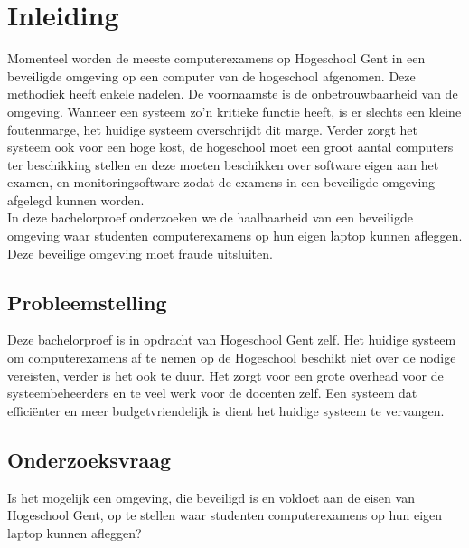 
\chapter{Inleiding}
\label{ch:inleiding}



 Momenteel worden de meeste computerexamens op Hogeschool Gent in een beveiligde omgeving op een computer van de hogeschool afgenomen. Deze methodiek heeft enkele nadelen. De voornaamste is de onbetrouwbaarheid van de omgeving. Wanneer een systeem zo'n kritieke functie heeft, is er slechts een kleine foutenmarge, het huidige systeem overschrijdt dit marge.  Verder zorgt het systeem ook voor een hoge kost, de hogeschool moet een groot aantal computers ter beschikking stellen en deze moeten beschikken over software eigen aan het examen, en monitoringsoftware zodat de examens in een beveiligde omgeving afgelegd kunnen worden. \\ In deze bachelorproef onderzoeken we de haalbaarheid van een beveiligde omgeving waar studenten computerexamens op hun eigen laptop kunnen afleggen. Deze beveilige omgeving moet fraude uitsluiten. \\


\section{Probleemstelling}
\label{sec:probleemstelling}

Deze bachelorproef is in opdracht van Hogeschool Gent zelf. Het huidige systeem om computerexamens af te nemen op de Hogeschool beschikt niet over de nodige vereisten, verder is het ook te duur. Het zorgt voor een grote overhead voor de systeembeheerders en te veel werk voor de docenten zelf. Een systeem dat effici\"{e}nter en meer budgetvriendelijk is dient het huidige systeem te vervangen.



\section{Onderzoeksvraag}
\label{sec:onderzoeksvraag}
Is het mogelijk een omgeving, die beveiligd is en voldoet aan de eisen van Hogeschool Gent, op te stellen waar studenten computerexamens op hun eigen laptop kunnen afleggen? 

